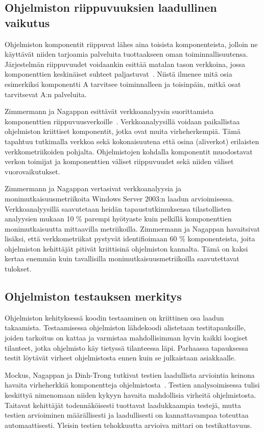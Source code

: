 \documentclass[finnish]{../tktltiki2}
\theoremstyle{definition}
\theoremstyle{remark}
\begin{document}
\subsection{Ohjelmiston riippuvuuksien laadullinen vaikutus}

    Ohjelmiston komponentit riippuvat lähes aina toisista komponenteista, jolloin ne käyttävät niiden tarjoamia 
palveluita tuottaakseen oman toiminnallisuutensa. Järjestelmän riippuvuudet voidaankin esittää matalan tason verkkoina, 
jossa komponenttien keskinäiset suhteet paljastuvat~\cite{ZN08}. Niistä ilmenee mitä osia esimerkiksi komponentti A 
tarvitsee toiminnalleen ja toisinpäin, mitkä osat tarvitsevat A:n palveluita.

    Zimmermann ja Nagappan esittävät verkkoanalyysin suorittamista komponenttien riippuvuusverkoille~\cite{ZN08}. 
Verkkoanalyysillä voidaan paikallistaa ohjelmiston kriittiset komponentit, jotka ovat muita virheherkempiä. Tämä 
tapahtuu tutkimalla verkkoa sekä kokonaisuutena että osina (aliverkot) erilaisten verkkometriikoiden pohjalta. 
Ohjelmistojen kohdalla komponentit muodostavat verkon toimijat ja komponenttien väliset riippuvuudet sekä niiden väliset 
vuorovaikutukset.

    Zimmermann ja Nagappan vertasivat verkkoanalyysia ja monimutkaisuusmetriikoita Windows Server 2003:n laadun 
arvioimisessa. Verkkoanalyysillä saavutetaan heidän tapaustutkimuksensa tilastollisten analyysien mukaan 10 \% parempi 
hyötyaste kuin pelkillä komponenttien monimutkaisuutta mittaavilla metriikoilla. Zimmermann ja Nagappan havaitsivat 
lisäksi, että verkkometriikat pystyvät identifioimaan 60 \% komponenteista, joita ohjelmiston kehittäjät pitivät 
kriittisinä ohjelmiston kannalta. Tämä on kaksi kertaa enemmän kuin tavallisilla monimutkaisuusmetriikoilla 
saavutettavat tulokset.

\subsection{Ohjelmiston testauksen merkitys}

Ohjelmiston kehityksessä koodin testaaminen on kriittinen osa laadun takaamista. Testaamisessa ohjelmiston lähdekoodi 
alistetaan testitapauksille, joiden tarkoitus on kattaa ja varmistaa mahdollisimman hyvin kaikki loogiset tilanteet, 
jotka ohjelmisto käy tietyssä tilanteessa läpi. Parhaassa tapauksessa testit löytävät virheet ohjelmistosta ennen kuin 
se julkaistaan asiakkaalle.

    Mockus, Nagappan ja Dinh-Trong tutkivat testien laadullista arviointia keinona havaita virheherkkiä komponentteja 
ohjelmistosta~\cite{MNDT09}. Testien analysoimisessa tulisi keskittyä nimenomaan niiden kykyyn havaita mahdollisia 
virheitä ohjelmistosta. Taitavat kehittäjät todennäköisesti tuottavat laadukkaampia testejä, mutta testien arvioiminen 
määrällisesti ja laadullisesti on kannattavampaa toteuttaa automaattisesti. Yleisin testien tehokkuutta arvioiva mittari 
on testikattavuus.
\end{document}
